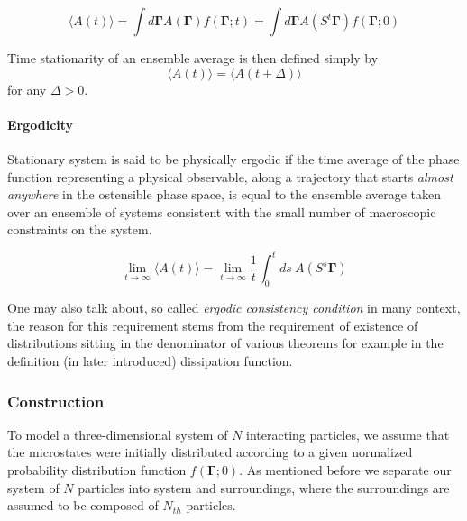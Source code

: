 \documentclass[a4paper,12pt,nofootinbib]{article}
\begin{document}
\begin{equation}
  \langle A(t) \rangle = \int d\bm{\Gamma} A(\bm{\Gamma}) f(\bm{\Gamma};t) = \int d\bm{\Gamma} A(S^t\bm{\Gamma})f(\bm{\Gamma};0)
\end{equation}

Time stationarity of an ensemble average is then defined simply by
\begin{equation}
\label{StationaryStateDef}
    \langle A(t) \rangle =   \langle A(t+\Delta) \rangle
\end{equation}
for any $\Delta > 0$.


\paragraph{Ergodicity}
Stationary system is said to be physically ergodic if the time average of the phase function representing a physical observable, along a trajectory that starts \textit{almost anywhere} in the ostensible phase space, is equal to the ensemble average taken over an ensemble of systems consistent with the small number of macroscopic constraints on the system.

\begin{equation}
    \lim_{t \to \infty} \langle A(t) \rangle = \lim_{t \to \infty} \frac{1}{t} \int_0^t ds\ A(S^s \bm{\Gamma})
\end{equation}

One may also talk about, so called \textit{ergodic consistency condition} in many context, the reason for this requirement stems from the requirement of existence of distributions sitting in the denominator of various theorems for example in the definition (in later introduced) dissipation function.

\subsubsection{Construction}

To model a three-dimensional system of $N$ interacting particles, we assume that the microstates were initially distributed according to a given normalized probability distribution function $f(\bm{\Gamma};0)$. As mentioned before we separate our system of $N$ particles into system and surroundings, where the surroundings are assumed to be composed of $N_{th}$ particles. 


\end{document}
